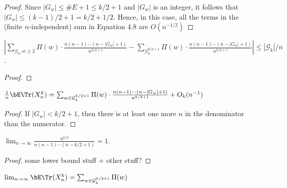 \begin{proof}
  \notready
  Since $|G_w|\le \#E+1 \le k/2+1$ and $|G_w|$ is an integer, it follows that $|G_w|\le (k-1)/2+1 = k/2 + 1/2$.  Hence, in this case, all the terms in the (finite $n$-independent) sum in Equation 4.8 are $O(n^{-1/2})$
\end{proof}


\begin{proposition}
  \label{prop:g_difference_bound}
  \notready
  $|\sum_{\mathcal{G}_{k}, w \ge 2} \Pi (w) \cdot \frac{n (n-1) \cdots (n - |G_w| + 1)}{n^{k/2+1}}
  - \sum_{\mathcal{G}_k^{k/2+1}}\Pi (w) \cdot \frac{n (n-1) \cdots (n - |G_w| + 1)}{n^{k/2+1}}|
  \le |\mathcal{G}_k|/n$.
\end{proposition}

\begin{proof}
  \notready
\end{proof}


\begin{proposition}%
  \label{prop:trace_ev_special_g}
  \notready
  $\frac1n\bE\Tr(X_n^k) = \sum_{w\in\mathcal{G}^{k/2+1}_k} \Pi(w) \cdot \frac{n(n-1)\cdots(n-|G_w|+1)}{n^{k/2+1}} + O_k(n^{-1})$
\end{proposition}

\begin{proof}
  \notready
  If $|G_w| < k/2 + 1$, then there is at least one more $n$ in the denominator than the numerator.
\end{proof}


\begin{proposition}
  \label{lem:fraction_limit_one}
  \notready
  $\lim_{n\to\infty}\frac{n^{k/2}}{n(n-1)\cdots(n-k/2+1)} = 1$.
\end{proposition}

\begin{proof}
  \notready
  some lower bound stuff + other stuff?
\end{proof}


\begin{proposition}
  \label{prop:trace_ev_limit_equals_sum}
  \notready
  $\lim_{n\to\infty}\bE\Tr(X_n^k) = \sum_{w\in\mathcal{G}^{k/2+1}_k} \Pi(w)$
\end{proposition}

